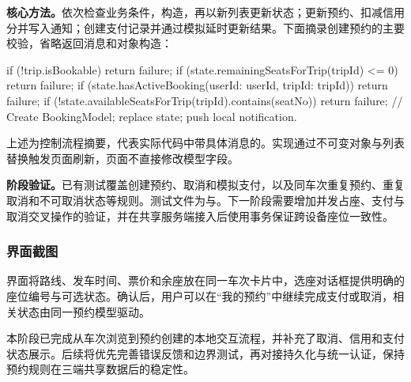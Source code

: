 \noindent\textbf{核心方法。}依次检查业务条件，构造，再以新列表更新状态；更新预约、扣减信用分并写入通知；创建支付记录并通过模拟延时更新结果。下面摘录创建预约的主要校验，省略返回消息和对象构造：
\begin{source}
if (!trip.isBookable) return failure;
if (state.remainingSeatsForTrip(tripId) <= 0) return failure;
if (state.hasActiveBooking(userId: userId, tripId: tripId)) {
  return failure;
}
if (!state.availableSeatsForTrip(tripId).contains(seatNo)) {
  return failure;
}
// Create BookingModel; replace state; push local notification.
\end{source}
\noindent 上述为控制流程摘要，代表实际代码中带具体消息的。实现通过不可变对象与列表替换触发页面刷新，页面不直接修改模型字段。

\noindent\textbf{阶段验证。}已有测试覆盖创建预约、取消和模拟支付，以及同车次重复预约、重复取消和不可取消状态等规则。测试文件为与。下一阶段需要增加并发占座、支付与取消交叉操作的验证，并在共享服务端接入后使用事务保证跨设备座位一致性。

\clearpage
\subsubsection{界面截图}

界面将路线、发车时间、票价和余座放在同一车次卡片中，选座对话框提供明确的座位编号与可选状态。确认后，用户可以在“我的预约”中继续完成支付或取消，相关状态由同一预约模型驱动。

本阶段已完成从车次浏览到预约创建的本地交互流程，并补充了取消、信用和支付状态展示。后续将优先完善错误反馈和边界测试，再对接持久化与统一认证，保持预约规则在三端共享数据后的稳定性。
